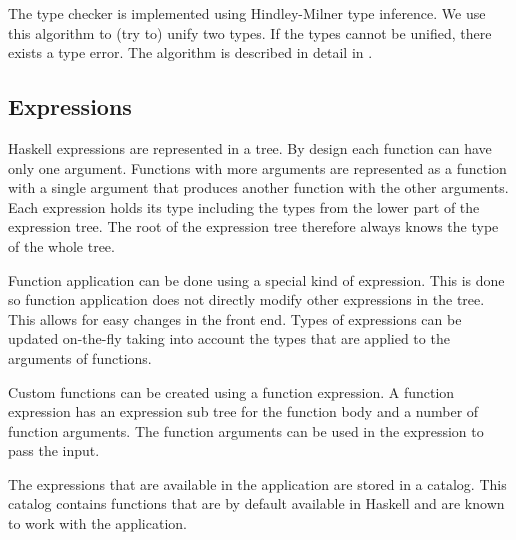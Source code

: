 The type checker is implemented using Hindley-Milner type inference. We use this algorithm to (try to) unify two
types. If the types cannot be unified, there exists a type error. The algorithm is described in detail in
\cite{borisov}.  

\subsection{Expressions}

Haskell expressions are represented in a tree.
By design each function can have only one argument.
Functions with more arguments are represented as a function with a single argument that produces another function with the other arguments.
Each expression holds its type including the types from the lower part of the expression tree. The root of the
expression tree therefore always knows the type of the whole tree.

Function application can be done using a special kind of expression.
This is done so function application does not directly modify other expressions in the tree.
This allows for easy changes in the front end.
Types of expressions can be updated on-the-fly taking into account the types that are applied to the arguments of functions.

Custom functions can be created using a function expression.
A function expression has an expression sub tree for the function body and a number of function arguments.
The function arguments can be used in the expression to pass the input.

The expressions that are available in the application are stored in a catalog. This catalog contains functions that are
by default available in Haskell and are known to work with the application.
